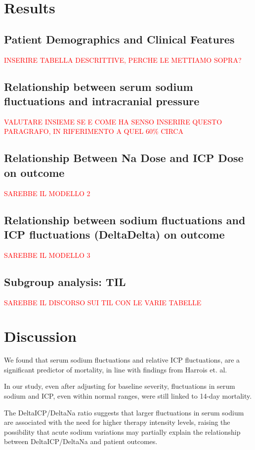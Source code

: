 \section {Results}
\subsection{Patient Demographics and Clinical Features}
\textcolor{red}{INSERIRE TABELLA DESCRITTIVE, PERCHE LE METTIAMO SOPRA?}

\subsection{Relationship between serum sodium fluctuations and intracranial pressure}
\textcolor{red}{VALUTARE INSIEME SE E COME HA SENSO INSERIRE QUESTO PARAGRAFO, IN RIFERIMENTO A QUEL 60\% CIRCA}

\subsection{Relationship Between Na Dose and ICP Dose on outcome}
\textcolor{red}{SAREBBE IL MODELLO 2}

\subsection{Relationship between sodium fluctuations and ICP fluctuations (DeltaDelta) on outcome}
\textcolor{red}{SAREBBE IL MODELLO 3}

\subsection{Subgroup analysis: TIL}
\textcolor{red}{SAREBBE IL DISCORSO SUI TIL CON LE VARIE TABELLE}


\section{Discussion}
We found that  serum sodium fluctuations and relative ICP fluctuations, are a significant predictor of mortality, in line with findings from Harrois et. al.\cite{harroisVariabilitySerumSodium2021a}

In our study, even after adjusting for baseline severity, fluctuations in serum sodium and ICP, even within normal ranges, were still linked to 14-day mortality.

The DeltaICP/DeltaNa ratio suggests that larger fluctuations in serum sodium are associated with the need for higher therapy intensity levels, raising the possibility that acute sodium variations may partially explain the relationship between DeltaICP/DeltaNa and patient outcomes.\\

